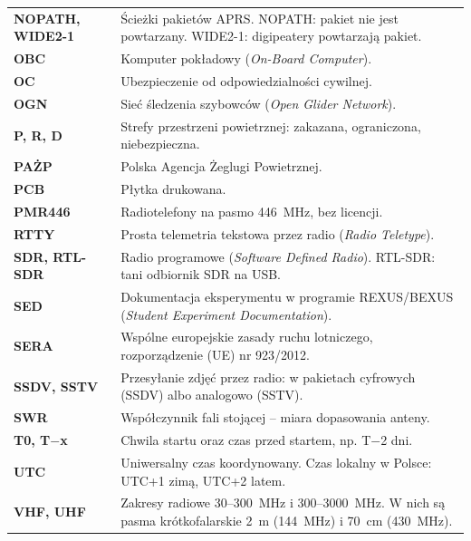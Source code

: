 \begin{tabularx}{\linewidth}{@{}>{\bfseries}P{20mm}L@{}}
NOPATH, WIDE2-1 & Ścieżki pakietów APRS. NOPATH: pakiet nie jest powtarzany. WIDE2-1: digipeatery powtarzają pakiet.\\
OBC & Komputer pokładowy (\emph{On-Board Computer}).\\
OC & Ubezpieczenie od odpowiedzialności cywilnej.\\
OGN & Sieć śledzenia szybowców (\emph{Open Glider Network}).\\
P, R, D & Strefy przestrzeni powietrznej: zakazana, ograniczona, niebezpieczna.\\
PAŻP & Polska Agencja Żeglugi Powietrznej.\\
PCB & Płytka drukowana.\\
PMR446 & Radiotelefony na pasmo \SI{446}{MHz}, bez licencji.\\
RTTY & Prosta telemetria tekstowa przez radio (\emph{Radio Teletype}).\\
SDR, RTL-SDR & Radio programowe (\emph{Software Defined Radio}). RTL-SDR: tani odbiornik SDR na USB.\\
SED & Dokumentacja eksperymentu w programie REXUS/BEXUS (\emph{Student Experiment Documentation}).\\
SERA & Wspólne europejskie zasady ruchu lotniczego, rozporządzenie (UE) nr 923/2012.\\
SSDV, SSTV & Przesyłanie zdjęć przez radio: w pakietach cyfrowych (SSDV) albo analogowo (SSTV).\\
SWR & Współczynnik fali stojącej -- miara dopasowania anteny.\\
T0, T$-$x & Chwila startu oraz czas przed startem, np. T$-$2 dni.\\
UTC & Uniwersalny czas koordynowany. Czas lokalny w Polsce: UTC+1 zimą, UTC+2 latem.\\
VHF, UHF & Zakresy radiowe 30--\SI{300}{MHz} i 300--\SI{3000}{MHz}. W nich są pasma krótkofalarskie \SI{2}{m} (\SI{144}{MHz}) i \SI{70}{cm} (\SI{430}{MHz}).\\
\bottomrule
\end{tabularx}
\normalsize

